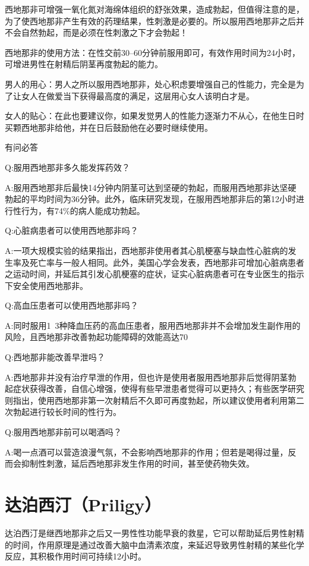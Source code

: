\documentclass[12pt,UTF8]{ctexbook}
\begin{document}
西地那非可增强一氧化氮对海绵体组织的舒张效果，造成勃起，但值得注意的是，为了使西地那非产生有效的药理结果，性刺激是必要的。所以服用西地那非之后并不会自然勃起，而是必须在性刺激之下才会勃起！

西地那非的使用方法：在性交前30--60分钟前服用即可，有效作用时间为24小时，可增进男性在射精后阴茎再度勃起的能力。

男人的用心：男人之所以服用西地那非，处心积虑要增强自己的性能力，完全是为了让女人在做爱当下获得最高度的满足，这层用心女人该明白才是。

女人的贴心：在此也要建议你，如果发觉男人的性能力逐渐力不从心，在他生日时买颗西地那非给他，并在日后鼓励他在必要时继续使用。

有问必答

Q:服用西地那非多久能发挥药效？

A:服用西地那非后最快14分钟内阴茎可达到坚硬的勃起，而服用西地那非达坚硬勃起的平均时间为36分钟。此外，临床研究发现，在服用西地那非后的第12小时进行性行为，有74\%的病人能成功勃起。

Q:心脏病患者可以使用西地那非吗？

A:一项大规模实验的结果指出，西地那非使用者其心肌梗塞与缺血性心脏病的发生率及死亡率与一般人相同。此外，美国心学会发表，西地那非可增加心脏病患者之运动时间，并延后其引发心肌梗塞的症状，证实心脏病患者可在专业医生的指示下安全使用西地那非。

Q:高血压患者可以使用西地那非吗？

A:同时服用1~3种降血压药的高血压患者，服用西地那非并不会增加发生副作用的风险，且西地那非改善勃起功能障碍的效能高达70%

Q:西地那非能改善早泄吗？

A:西地那非并没有治疗早泄的作用，但也许是使用者服用西地那非后觉得阴茎勃起症状获得改善，自信心增强，使得有些早泄患者觉得可以更持久；有些医学研究则指出，使用西地那非第一次射精后不久即可再度勃起，所以建议使用者利用第二次勃起进行较长时间的性行为。

Q:服用西地那非前可以喝酒吗？

A:喝一点酒可以营造浪漫气氛，不会影响西地那非的作用；但若是喝得过量，反而会抑制性刺激，延后西地那非发生作用的时间，甚至使药物失效。

\section{达泊西汀（Priligy）}

达泊西汀是继西地那非之后又一男性性功能早衰的救星，它可以帮助延后男性射精的时间，作用原理是通过改善大脑中血清素浓度，来延迟导致男性射精的某些化学反应，其积极作用时间可持续12小时。
\end{document}
